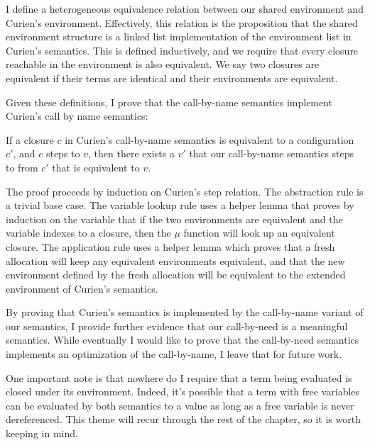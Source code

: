 I define a heterogeneous equivalence relation between our shared environment
and Curien's environment. Effectively, this relation is the proposition that
the shared environment structure is a linked list implementation of the
environment list in Curien's semantics. This is defined inductively, and we
require that every closure reachable in the environment is also equivalent.  We
say two closures are equivalent if their terms are identical and their
environments are equivalent. 

Given these definitions, I prove that the call-by-name \ce semantics implement 
Curien's call by name semantics: 

\begin{thm}
If a closure $c$ in Curien's call-by-name semantics is equivalent to a
configuration $c'$, and $c$ steps to $v$, then there exists a $v'$ that our
call-by-name semantics steps to from $c'$ that is equivalent to $v$.
\end{thm}
\begin{proofoutline}
The proof proceeds by induction on Curien's step relation. The abstraction rule
is a trivial base case. The variable lookup rule uses a helper lemma that proves
by induction on the variable that if the two environments are equivalent and the
variable indexes to a closure, then the $\mu$ function will look up an
equivalent closure. The application rule uses a helper lemma which proves that a
fresh allocation will keep any equivalent environments equivalent, and that the
new environment defined by the fresh allocation will be equivalent to the
extended environment of Curien's semantics.
\end{proofoutline}

By proving that Curien's semantics is implemented by the call-by-name variant of
our semantics, I provide further evidence that our call-by-need is a
meaningful semantics. While eventually I would like to prove that the
call-by-need semantics implements an optimization of the call-by-name, I leave
that for future work.

One important note is that nowhere do I require that a term being evaluated is
closed under its environment. Indeed, it's possible that a term with free variables
can be evaluated by both semantics to a value as long as a free variable is
never dereferenced. This theme will recur through the rest of the chapter, so it
is worth keeping in mind.  
